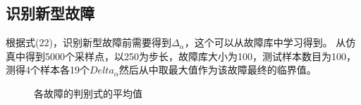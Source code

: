 \documentclass[lang=cn,11pt,a4paper]{elegantpaper}
\begin{document}
\subsection{识别新型故障}
根据式(22)，识别新型故障前需要得到$\Delta_{\alpha}$，这个可以从故障库中学习得到。
从仿真中得到5000个采样点，以250为步长，故障库大小为100，测试样本数目为100，测得4个样本各19个$Delta_\alpha$然后从中取最大值作为该故障最终的临界值。
\begin{figure}[H]
	\centering  %
	\caption{各故障的判别式的平均值}
	\label{Fig.main}
\end{figure}
\end{document}
